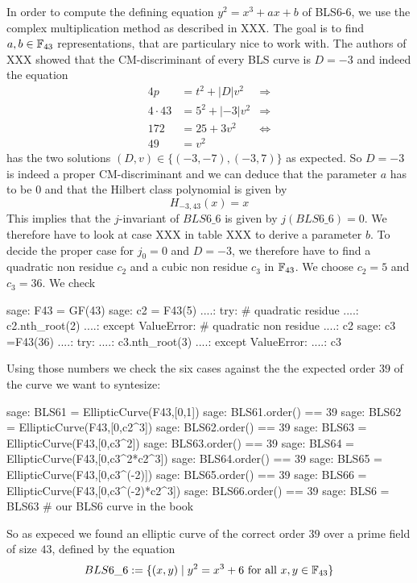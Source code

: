 In order to compute the defining equation $y^2=x^3 + ax + b$ of BLS6-6, we use the complex multiplication method as described in XXX. The goal is to find $a,b\in\mathbb{F}_{43}$ representations, that are particulary nice to work with. The authors of XXX showed that the CM-discriminant of every BLS curve is $D=-3$ and indeed the equation
\begin{align*}
4p & = t^2 + |D|v^2 & \Rightarrow \\ 
4\cdot 43 & = 5^2 + |-3|v^2 & \Rightarrow \\ 
172 & = 25 + 3 v^2 & \Leftrightarrow \\ 
49 & = v^2
\end{align*}
has the two solutions $(D,v)\in\{(-3,-7),(-3,7)\}$ as expected. So $D=-3$ is indeed a proper CM-discriminant and we can deduce that the parameter $a$ has to be $0$ and that the Hilbert class polynomial is given by
$$
H_{-3,43}(x) = x
$$
This implies that the $j$-invariant of $BLS6\_6$ is given by $j(BLS6\_6)=0$. We therefore have to look at case XXX in table XXX to derive a parameter $b$. To decide the proper case for $j_0=0$ and $D=-3$, we therefore have to find a quadratic non residue $c_2$ and a cubic non residue $c_3$ in $\mathbb{F}_{43}$. We choose 
$c_2 =5$ and $c_3=36$. We check
\begin{sagecommandline}
sage: F43 = GF(43)
sage: c2 = F43(5)
....: try: # quadratic residue
....:     c2.nth_root(2)
....: except ValueError: # quadratic non residue
....:     c2
sage: c3 =F43(36)
....: try:
....:     c3.nth_root(3)
....: except ValueError:
....:     c3
\end{sagecommandline} Using those numbers we check the six cases against the the expected order $39$ of the curve we want to syntesize:
\begin{sagecommandline}
sage: BLS61 = EllipticCurve(F43,[0,1])
sage: BLS61.order() == 39
sage: BLS62 = EllipticCurve(F43,[0,c2^3])
sage: BLS62.order() == 39
sage: BLS63 = EllipticCurve(F43,[0,c3^2])
sage: BLS63.order() == 39
sage: BLS64 = EllipticCurve(F43,[0,c3^2*c2^3])
sage: BLS64.order() == 39
sage: BLS65 = EllipticCurve(F43,[0,c3^(-2)])
sage: BLS65.order() == 39
sage: BLS66 = EllipticCurve(F43,[0,c3^(-2)*c2^3])
sage: BLS66.order() == 39
sage: BLS6 = BLS63 # our BLS6 curve in the book
\end{sagecommandline}
So as expeced we found an elliptic curve of the correct order $39$ over a prime field of size $43$, defined by the equation
\begin{equation}
BLS6\_6 := \{(x,y)\;|\; y^2 = x^3 + 6 \text{ for all } x,y \in \mathbb{F}_{43}\}
\end{equation}

